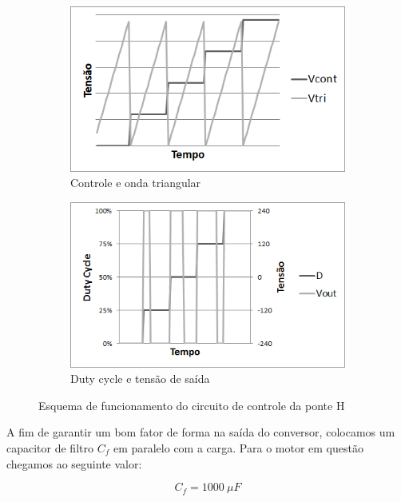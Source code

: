 \documentclass{article}
\begin{document}
\begin{figure}[H]
	\centering
	\begin{subfigure}[t]{0.45\textwidth}
		\includegraphics[width=\linewidth]{ponte1}
		\caption{Controle e onda triangular}
	\end{subfigure}
	\begin{subfigure}[t]{0.45\textwidth}
		\includegraphics[width=\linewidth]{ponte2}
		\caption{Duty cycle e tensão de saída}
	\end{subfigure}
	\caption{Esquema de funcionamento do circuito de controle da ponte H}	
	\label{fig:ponte}
\end{figure}

A fim de garantir um bom fator de forma na saída do conversor, colocamos um capacitor de filtro $C_f$ em paralelo com a carga. Para o motor em questão chegamos ao seguinte valor:

\begin{equation}
C_f=1000\ \mu F
\end{equation}
\end{document}
